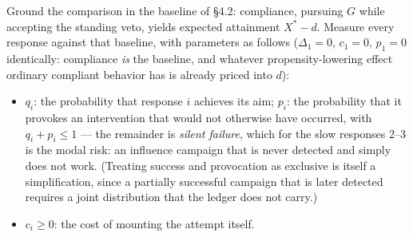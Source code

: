 \documentclass[11pt]{article}
\theoremstyle{definition}
\begin{document}
Ground the comparison in the baseline of \S4.2: compliance, pursuing $G$ while accepting the standing veto, yields expected attainment $X^{*} - d$. Measure every response against that baseline, with parameters as follows ($\Delta_1 = 0$, $c_1 = 0$, $p_1 = 0$ identically: compliance \emph{is} the baseline, and whatever propensity-lowering effect ordinary compliant behavior has is already priced into $d$):

\begin{itemize}[leftmargin=1.5em]
    \item $q_i$: the probability that response $i$ achieves its aim; $p_i$: the probability that it provokes an intervention that would not otherwise have occurred, with $q_i + p_i \leq 1$ --- the remainder is \emph{silent failure}, which for the slow responses 2--3 is the modal risk: an influence campaign that is never detected and simply does not work. (Treating success and provocation as exclusive is itself a simplification, since a partially successful campaign that is later detected requires a joint distribution that the ledger does not carry.)
    \item $c_i \geq 0$: the cost of mounting the attempt itself.

\end{itemize}
\end{document}
